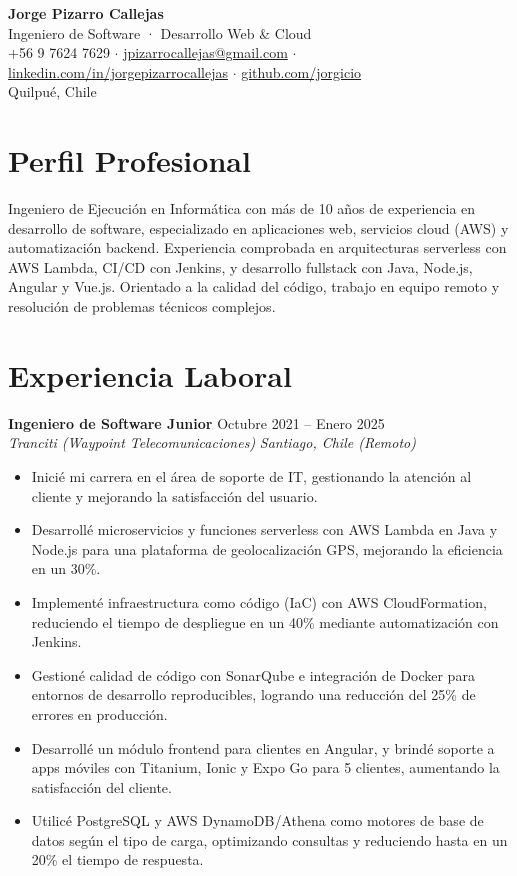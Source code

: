 \documentclass[11pt,a4paper]{article}
\newcommand{\job}[4]{%
    \textbf{#1} \hfill #2\\
    \textit{#3} \hfill \textit{#4}\\[2pt]
}
\begin{document}
\begin{center}
    {\Huge \textbf{Jorge Pizarro Callejas}}\\[4pt]
    {\large Ingeniero de Software · Desarrollo Web \& Cloud}\\[6pt]
    +56 9 7624 7629 \; $\cdot$ \; \href{mailto:jpizarrocallejas@gmail.com}{jpizarrocallejas@gmail.com} \; $\cdot$ \;
    \href{https://linkedin.com/in/jorgepizarrocallejas}{linkedin.com/in/jorgepizarrocallejas} \; $\cdot$ \;
    \href{https://github.com/jorgicio}{github.com/jorgicio}\\[2pt]
    Quilpué, Chile
\end{center}

\vspace{4pt}

\section*{Perfil Profesional}
Ingeniero de Ejecución en Informática con más de 10 años de experiencia en desarrollo de software, especializado en aplicaciones web, servicios cloud (AWS) y automatización backend. Experiencia comprobada en arquitecturas serverless con AWS Lambda, CI/CD con Jenkins, y desarrollo fullstack con Java, Node.js, Angular y Vue.js. Orientado a la calidad del código, trabajo en equipo remoto y resolución de problemas técnicos complejos.


\section*{Experiencia Laboral}

\job{Ingeniero de Software Junior}{Octubre 2021 -- Enero 2025}{Tranciti (Waypoint Telecomunicaciones)}{Santiago, Chile (Remoto)}
\begin{itemize}[leftmargin=*, itemsep=1pt, topsep=2pt]
    \item Inicié mi carrera en el área de soporte de IT, gestionando la atención al cliente y mejorando la satisfacción del usuario.
    \item Desarrollé microservicios y funciones serverless con AWS Lambda en Java y Node.js para una plataforma de geolocalización GPS, mejorando la eficiencia en un 30\%.
    \item Implementé infraestructura como código (IaC) con AWS CloudFormation, reduciendo el tiempo de despliegue en un 40\% mediante automatización con Jenkins.
    \item Gestioné calidad de código con SonarQube e integración de Docker para entornos de desarrollo reproducibles, logrando una reducción del 25\% de errores en producción.
    \item Desarrollé un módulo frontend para clientes en Angular, y brindé soporte a apps móviles con Titanium, Ionic y Expo Go para 5 clientes, aumentando la satisfacción del cliente.
    \item Utilicé PostgreSQL y AWS DynamoDB/Athena como motores de base de datos según el tipo de carga, optimizando consultas y reduciendo hasta en un 20\% el tiempo de respuesta.
\end{itemize}
\end{document}
